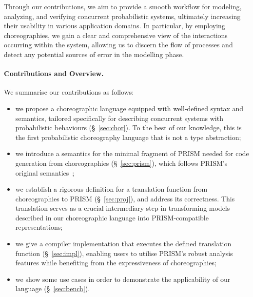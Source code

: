 Through our contributions, we aim to provide a smooth workflow for
modeling, analyzing, and verifying concurrent probabilistic systems,
ultimately increasing their usability in various application domains.
%
In particular, by employing choreographies, we gain a clear and
comprehensive view of the interactions occurring within the system,
allowing us to discern the flow of processes and detect any potential
sources of error in the modelling phase.


\paragraph{Contributions and Overview.} We summarise our contributions as
follows:
\begin{itemize} 
\item we propose a choreographic language equipped with well-defined
  syntax and semantics, tailored specifically for describing
  concurrent systems with probabilistic behaviours
  (\S~\ref{sec:chor}). To the best of our knowledge, this is the first
  probabilistic choreography language that is not a type abstraction;

\item we introduce a semantics for the minimal fragment of PRISM
  needed for code generation from choreographies (\S~\ref{sec:prism}),
  which follows PRISM's original semantics~\cite{PRISMdoc};

\item we establish a rigorous definition for a translation function
  from choreographies to PRISM (\S~\ref{sec:proj}), and address its
  correctness. This translation serves as a crucial intermediary step
  in transforming models described in our choreographic language into
  PRISM-compatible representations;

\item we give a compiler implementation that executes the defined
  translation function (\S~\ref{sec:impl}),
  enabling users to utilise PRISM's robust analysis features while
  benefiting from the expressiveness of choreographies;

\item we show some use cases in order to demonstrate the applicability
  of our language (\S~\ref{sec:bench}).
\end{itemize}

